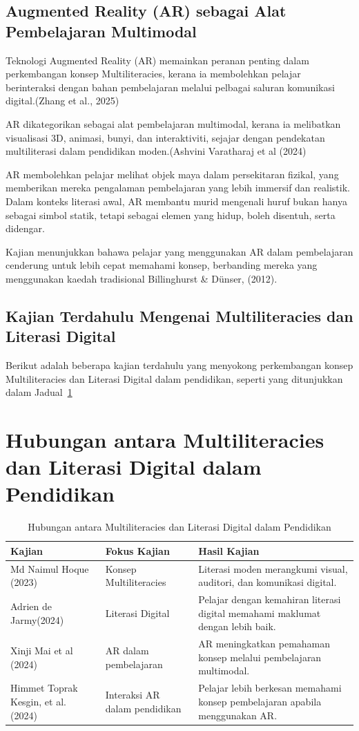 \subsection{Augmented Reality (AR) sebagai Alat Pembelajaran Multimodal}
Teknologi Augmented Reality (AR) memainkan peranan penting dalam perkembangan konsep Multiliteracies, kerana ia membolehkan pelajar berinteraksi dengan bahan pembelajaran melalui pelbagai saluran komunikasi digital.(Zhang et al., 2025)

AR dikategorikan sebagai alat pembelajaran multimodal, kerana ia melibatkan visualisasi 3D, animasi, bunyi, dan interaktiviti, sejajar dengan pendekatan multiliterasi dalam pendidikan moden.(Ashvini Varatharaj  et al (2024)

AR membolehkan pelajar melihat objek maya dalam persekitaran fizikal, yang memberikan mereka pengalaman pembelajaran yang lebih immersif dan realistik. Dalam konteks literasi awal, AR membantu murid mengenali huruf bukan hanya sebagai simbol statik, tetapi sebagai elemen yang hidup, boleh disentuh, serta didengar.

Kajian menunjukkan bahawa pelajar yang menggunakan AR dalam pembelajaran cenderung untuk lebih cepat memahami konsep, berbanding mereka yang menggunakan kaedah tradisional Billinghurst \& Dünser, (2012).

\subsection{Kajian Terdahulu Mengenai Multiliteracies dan Literasi Digital}
Berikut adalah beberapa kajian terdahulu yang menyokong perkembangan konsep Multiliteracies dan Literasi Digital dalam pendidikan, seperti yang ditunjukkan dalam Jadual~\ref{tab:multiliteracies}
\section{Hubungan antara Multiliteracies dan Literasi Digital dalam Pendidikan}

\begin{table}[htbp]
    \centering
    \caption{Hubungan antara Multiliteracies dan Literasi Digital dalam Pendidikan}
    \label{tab:multiliteracies}
    \begin{tabular}{@{}p{3cm} p{4cm} p{6cm}@{}}
        \toprule
        \textbf{Kajian} & \textbf{Fokus Kajian} & \textbf{Hasil Kajian} \\
        \midrule
        Md Naimul Hoque (2023) & Konsep Multiliteracies & Literasi moden merangkumi visual, auditori, dan komunikasi digital. \\
       Adrien de Jarmy(2024) & Literasi Digital & Pelajar dengan kemahiran literasi digital memahami maklumat dengan lebih baik. \\
        Xinji Mai et al (2024) & AR dalam pembelajaran & AR meningkatkan pemahaman konsep melalui pembelajaran multimodal. \\
       Himmet Toprak Kesgin, et al. (2024) & Interaksi AR dalam pendidikan & Pelajar lebih berkesan memahami konsep pembelajaran apabila menggunakan AR. \\
        \bottomrule
    \end{tabular}
\end{table}


